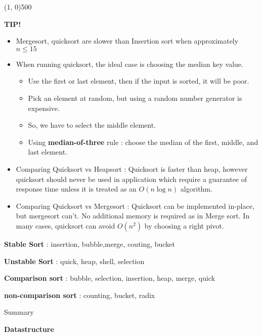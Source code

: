 \begin{center}
    \par\noindent\line(1, 0){500}
\end{center}

\textbf{TIP!}

\begin{itemize}
    \item Mergesort, quicksort are slower than Insertion sort when approximately $ n \le 15$
    \item When running quicksort, the ideal case is choosing the median key value.
    \begin{itemize}
        \item Use the first or last element, then if the input is sorted, it will be poor.
        \item Pick an element at random, but using a random number generator is expensive.
        \item So, we have to select the middle element.
        \item Using \textbf{median-of-three} rule : choose the median of the first, middle, and last element.
    \end{itemize}
    \item Comparing Quicksort vs Heapsort : Quicksort is faster than heap, however quicksort should never be used in application which require a guarantee of response time unless it is treated as an $O(n\log n)$ algorithm.
    \item Comparing Quicksort vs Mergesort : Quicksort can be implemented in-place, but mergesort can't. No additional memory is required as in Merge sort. In many cases, quicksort can avoid $O(n^2)$ by choosing a right pivot.
\end{itemize}


\bigskip
\textbf{Stable Sort} : insertion, bubble,merge, couting, bucket

\textbf{Unstable Sort} : quick, heap, shell, selection

\medskip
\textbf{Comparison sort} : bubble, selection, insertion, heap, merge, quick

\textbf{non-comparison sort} : counting, bucket, radix



\newpage

\begin{section}
    {Summary}
\end{section}

{\textbf{Datastructure}}

